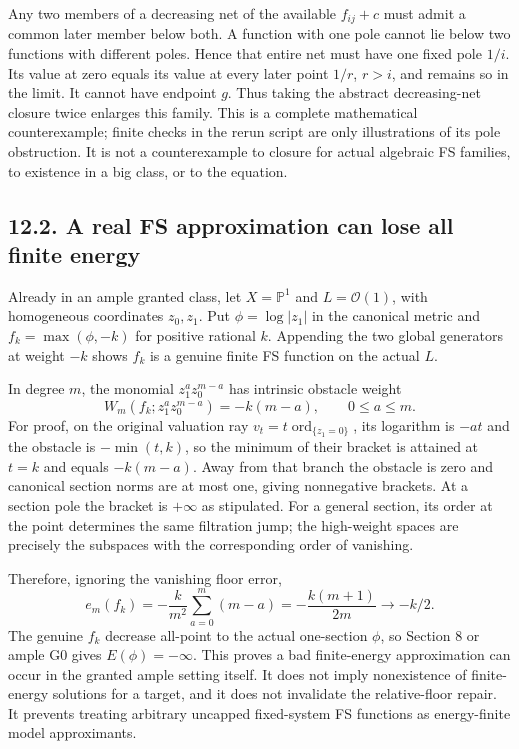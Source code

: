 \documentclass[
  10pt,
]{article}
\begin{document}
Any two members of a decreasing net of the available \(f_{ij}+c\) must
admit a common later member below both. A function with one pole cannot
lie below two functions with different poles. Hence that entire net must
have one fixed pole \(1/i\). Its value at zero equals its value at every
later point \(1/r\), \(r>i\), and remains so in the limit. It cannot
have endpoint \(g\). Thus taking the abstract decreasing-net closure
twice enlarges this family. This is a complete mathematical
counterexample; finite checks in the rerun script are only illustrations
of its pole obstruction. It is not a counterexample to closure for
actual algebraic FS families, to existence in a big class, or to the
equation.

\subsection{12.2. A real FS approximation can lose all finite
energy}\label{a-real-fs-approximation-can-lose-all-finite-energy}

Already in an ample granted class, let \(X=\mathbb P^1\) and
\(L=\mathcal O(1)\), with homogeneous coordinates \(z_0,z_1\). Put
\(\phi=\log|z_1|\) in the canonical metric and \(f_k=\max(\phi,-k)\) for
positive rational \(k\). Appending the two global generators at weight
\(-k\) shows \(f_k\) is a genuine finite FS function on the actual
\(L\).

In degree \(m\), the monomial \(z_1^az_0^{m-a}\) has intrinsic obstacle
weight \[W_m(f_k;z_1^az_0^{m-a})=-k(m-a),\qquad 0\leq a\leq m.\] For
proof, on the original valuation ray
\(v_t=t\operatorname{ord}_{\{z_1=0\}}\), its logarithm is \(-at\) and
the obstacle is \(-\min(t,k)\), so the minimum of their bracket is
attained at \(t=k\) and equals \(-k(m-a)\). Away from that branch the
obstacle is zero and canonical section norms are at most one, giving
nonnegative brackets. At a section pole the bracket is \(+\infty\) as
stipulated. For a general section, its order at the point determines the
same filtration jump; the high-weight spaces are precisely the subspaces
with the corresponding order of vanishing.

Therefore, ignoring the vanishing floor error,
\[e_m(f_k)=-\frac{k}{m^2}\sum_{a=0}^m(m-a)
=-\frac{k(m+1)}{2m}\longrightarrow-k/2.\] The genuine \(f_k\) decrease
all-point to the actual one-section \(\phi\), so Section 8 or ample G0
gives \(E(\phi)=-\infty\). This proves a bad finite-energy approximation
can occur in the granted ample setting itself. It does not imply
nonexistence of finite-energy solutions for a target, and it does not
invalidate the relative-floor repair. It prevents treating arbitrary
uncapped fixed-system FS functions as energy-finite model approximants.
\end{document}

